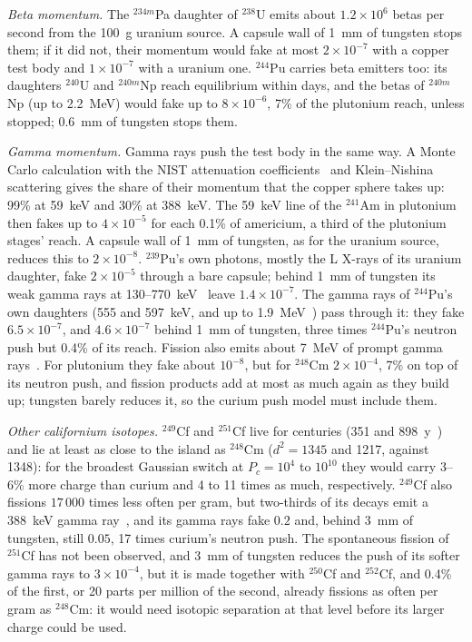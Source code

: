 \documentclass[aps,prd,onecolumn,superscriptaddress,floatfix,nofootinbib]{revtex4-2}
\newcommand{\Pu}[1]{$^{#1}$Pu}
\newcommand{\nuc}[2]{$^{#1}$#2}
\begin{document}
\textit{Beta momentum.} The \nuc{234m}{Pa} daughter of \nuc{238}{U} emits about $1.2\times10^{6}$ betas per second
from the 100~g uranium source. A capsule wall of 1~mm of tungsten stops them; if it did not, their momentum would
fake at most $2\times10^{-7}$ with a copper test body and $1\times10^{-7}$ with a uranium one. \Pu{244} carries
beta emitters too: its daughters \nuc{240}{U} and \nuc{240m}{Np} reach equilibrium within days, and the betas of
\nuc{240m}{Np} (up to 2.2~MeV) would fake up to $8\times10^{-6}$, 7\% of the plutonium reach, unless stopped;
0.6~mm of tungsten stops them.

\textit{Gamma momentum.} Gamma rays push the test body in the same way. A Monte Carlo calculation with the NIST
attenuation coefficients~\cite{Hubbell2004} and Klein--Nishina scattering gives the share of their momentum that
the copper sphere takes up: 99\% at 59~keV and 30\% at 388~keV. The 59~keV line of the \nuc{241}{Am} in
plutonium~\cite{ENSDF} then fakes up to $4\times10^{-5}$ for each 0.1\% of americium, a third of the plutonium
stages' reach. A capsule wall of 1~mm of tungsten, as for the uranium source, reduces this to $2\times10^{-8}$.
\Pu{239}'s own photons, mostly the L X-rays of its uranium daughter, fake $2\times10^{-5}$ through a bare capsule; behind
1~mm of tungsten its weak gamma rays at 130--770~keV~\cite{ENSDF} leave $1.4\times10^{-7}$.
The gamma rays of \Pu{244}'s own daughters (555 and 597~keV, and up to 1.9~MeV~\cite{ENSDF}) pass through it: they
fake $6.5\times10^{-7}$, and $4.6\times10^{-7}$ behind 1~mm of tungsten, three times \Pu{244}'s neutron push but
0.4\% of its reach. Fission also emits about 7~MeV of prompt gamma rays~\cite{Verbinski1973}. For plutonium they
fake about $10^{-8}$, but for \nuc{248}{Cm} $2\times10^{-4}$, 7\% on top of its neutron push, and fission products
add at most as much again as they build up; tungsten barely reduces it, so the curium push model must include them.

\textit{Other californium isotopes.} \nuc{249}{Cf} and \nuc{251}{Cf} live for centuries (351 and
898~y~\cite{Kondev2021}) and lie at least as close to the island as \nuc{248}{Cm} ($d^2=1345$ and 1217, against
1348): for the broadest Gaussian switch at $P_c=10^{4}$ to $10^{10}$ they would carry 3--6\% more charge than
curium and 4 to 11 times as much, respectively. \nuc{249}{Cf} also fissions $17\,000$ times less often per gram,
but two-thirds of its decays emit a 388~keV gamma ray~\cite{ENSDF}, and its gamma rays fake $0.2$ and, behind
3~mm of tungsten, still $0.05$, 17 times curium's neutron push. The spontaneous fission of \nuc{251}{Cf} has not
been observed, and 3~mm of tungsten reduces the push of its softer gamma rays to $3\times10^{-4}$, but it is made
together with \nuc{250}{Cf} and \nuc{252}{Cf}, and 0.4\% of the first, or 20 parts per million of the second,
already fissions as often per gram as \nuc{248}{Cm}: it would need isotopic separation at that level before its
larger charge could be used.
\end{document}
